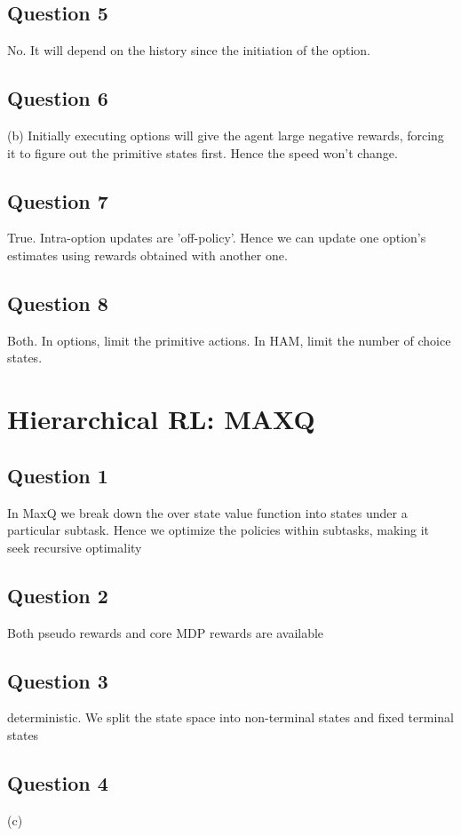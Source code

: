 \documentclass[12pt]{extarticle}
\begin{document}
\subsection{Question 5}
No. It will depend on the history since the initiation of the option.

\subsection{Question 6}
(b) Initially executing options will give the agent large negative rewards, forcing it to figure out the primitive states first. Hence the speed won't change.

\subsection{Question 7}
True. Intra-option updates are 'off-policy'. Hence we can update one option's estimates using rewards obtained with another one.

\subsection{Question 8}
Both. In options, limit the primitive actions. In HAM, limit the number of choice states.

\section{Hierarchical RL: MAXQ}
\subsection{Question 1}
In MaxQ we break down the over state value function into states under a particular subtask. Hence we optimize the policies within subtasks, making it seek recursive optimality

\subsection{Question 2}
Both pseudo rewards and core MDP rewards are available

\subsection{Question 3}
deterministic. We split the state space into non-terminal states and fixed terminal states

\subsection{Question 4}
(c)
\end{document}
